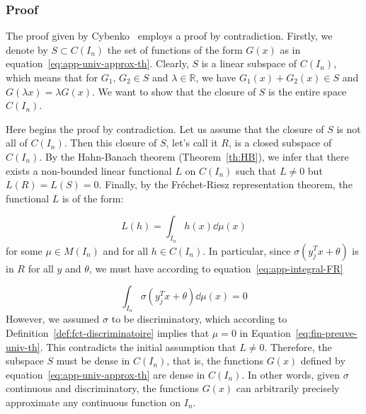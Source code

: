 \subsubsection{Proof}

The proof given by Cybenko~\cite{cybenko1989} employs a proof by contradiction. Firstly, we denote by $S \subset C(I_n)$ the set of functions of the form $G(x)$ as in equation~\eqref{eq:app-univ-approx-th}. Clearly, $S$ is a linear subspace of $C(I_n)$, which means that for $G_1\text{, }G_2 \in S$ and $\lambda \in \mathbb{R}$, we have $G_1 (x) + G_2(x) \in S$ and $G(\lambda x) = \lambda G(x)$. We want to show that the closure of $S$ is the entire space $C(I_n)$.

\par Here begins the proof by contradiction. Let us assume that the closure of $S$ is not all of $C(I_n)$. Then this closure of $S$, let's call it $R$, is a closed subspace of $C(I_n)$. By the Hahn-Banach theorem (Theorem~\ref{th:HB}), we infer that there exists a non-bounded linear functional $L$ on $C(I_n)$ such that $L \neq 0$ but $L(R)=L(S)=0$. Finally, by the Fréchet-Riesz representation theorem, the functional $L$ is of the form:

\begin{equation}
\label{eq:app-integral-FR}
L(h) = \int_{I_n} h(x) \dd\mu(x)
\end{equation} for some $\mu \in M(I_n)$ and for all $h \in C(I_n)$. In particular, since $\sigma \left( y_j^T x + \theta \right)$ is in $R$ for all $y$ and $\theta$, we must have according to equation~\eqref{eq:app-integral-FR}

\begin{equation}
\label{eq:fin-preuve-univ-th}
\int_{I_n} \sigma \left( y_j^T x + \theta \right) \dd \mu(x) = 0
\end{equation}
However, we assumed $\sigma$ to be discriminatory, which according to Definition~\ref{def:fct-discriminatoire} implies that $\mu=0$ in Equation~\eqref{eq:fin-preuve-univ-th}. This contradicts the initial assumption that $L\neq 0$. Therefore, the subspace $S$ must be dense in $C(I_n)$, that is, the functions $G(x)$ defined by equation~\eqref{eq:app-univ-approx-th} are dense in $C(I_n)$. In other words, given $\sigma$ continuous and discriminatory, the functions $G(x)$ can arbitrarily precisely approximate any continuous function on $I_n$.